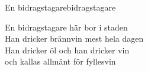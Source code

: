 \begin{song}{En bidragstagare}{bidragstagare}
\begin{vers}
En bidragstagare här bor i staden\\
Han dricker brännvin mest hela dagen\\
Han dricker öl och han dricker vin\\
och kallas allmänt för fyllesvin\\
\end{vers}
\end{song}
